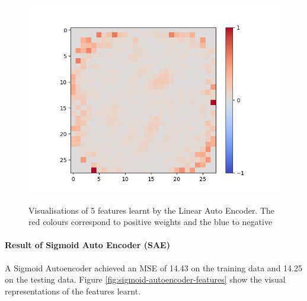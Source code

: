 \begin{figure}[H]
\begin{minipage}[b]{0.19\textwidth}
		\includegraphics[width=\textwidth]{Linear-AE/Feature-18.png}
		\label{}
	\end{minipage}
	
	\caption{Visualisations of 5 features learnt by the Linear Auto Encoder. The red colours correspond to positive weights and the blue to negative}
	\label{fig:linear-autoencoder-features}
	\hfill
\end{figure}

\paragraph{Result of Sigmoid Auto Encoder (SAE)}
A Sigmoid Autoencoder achieved an MSE of 14.43 on the training data and 14.25 on the testing data. Figure \ref{fig:sigmoid-autoencoder-features} show the visual representations of the features learnt.

